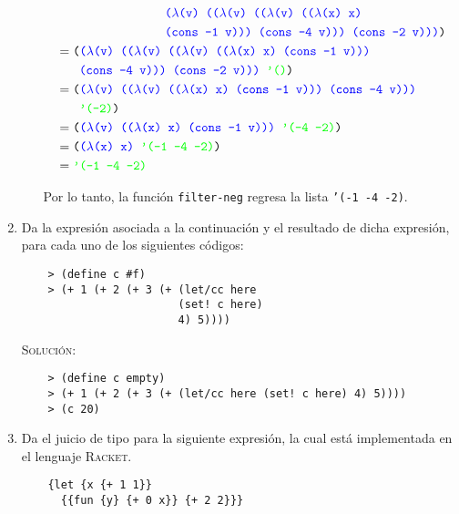 \documentclass[letterpaper,11pt]{article}
\begin{document}
\begin{enumerate}
\begin{enumerate}
\begin{align*}
            & \quad \quad \quad \quad \quad \quad \quad \quad \; \;
            \texttt{\textcolor{blue}{($\lambda$(v) (($\lambda$(v) (($\lambda$(v) (($\lambda$(x) x)}} \\ 
            & \quad \quad \quad \quad \quad \quad \quad \quad \; \;
            \texttt{\textcolor{blue}{(cons -1 v))) (cons -4 v))) (cons -2 v)))})} \\ 
            &= \texttt{(\textcolor{blue}{($\lambda$(v) (($\lambda$(v) (($\lambda$(v) (($\lambda$(x) x) (cons -1 v)))}} \\ 
            & \quad \; \; \; 
            \texttt{\textcolor{blue}{(cons -4 v))) (cons -2 v)))}  \textcolor{green}{'()})} \\ 
            &= \texttt{(\textcolor{blue}{($\lambda$(v) (($\lambda$(v) (($\lambda$(x) x) (cons -1 v))) (cons -4 v)))}} \\ 
            & \quad \; \; \; 
            \texttt{\textcolor{green}{'(-2)})} \\ 
            &= \texttt{(\textcolor{blue}{($\lambda$(v) (($\lambda$(x) x) (cons -1 v)))}
                        \textcolor{green}{'(-4 -2)})} \\ 
            &= \texttt{(\textcolor{blue}{($\lambda$(x) x)}
                        \textcolor{green}{'(-1 -4 -2)})} \\
            &= \texttt{\textcolor{green}{'(-1 -4 -2)}}
        \end{align*}

        Por lo tanto, la función \texttt{filter-neg} regresa la lista \texttt{'(-1 -4 -2)}.
    \end{enumerate}

    \item Da la expresión asociada a la continuación y el resultado de dicha 
    expresión, para cada uno de los siguientes códigos:
    \begin{verbatim}
    > (define c #f)
    > (+ 1 (+ 2 (+ 3 (+ (let/cc here 
                        (set! c here)
                        4) 5))))
    \end{verbatim}

    \textsc{Solución:}

    \begin{verbatim}
    > (define c empty)
    > (+ 1 (+ 2 (+ 3 (+ (let/cc here (set! c here) 4) 5))))
    > (c 20)
    \end{verbatim}

    \item Da el juicio de tipo para la siguiente expresión, la cual está 
    implementada en el lenguaje \textsc{Racket}.
    \begin{verbatim}
    {let {x {+ 1 1}}
      {{fun {y} {+ 0 x}} {+ 2 2}}}
    \end{verbatim}


\end{enumerate}
\end{document}
